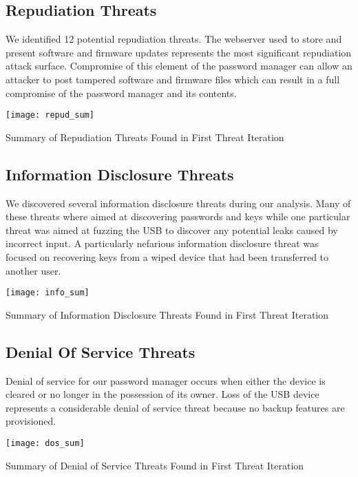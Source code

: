 \subsection{Repudiation Threats}


We identified 12 potential repudiation threats.  The webserver used to store and present software and firmware updates
represents the most significant repudiation attack surface.  Compromise of this
element of the password manager can allow an attacker to post tampered software
and firmware files which can result in a full compromise of the password manager
and its contents.
\begin{table*}[ht]
    \centering
    \texttt{[image: repud\_sum]}
    \caption{Summary of Repudiation Threats Found in First Threat Iteration}
    \label{tab:repudsum}
\end{table*}



\subsection{Information Disclosure Threats}
We discovered several information disclosure threats during our analysis.  Many
of these threats where aimed at discovering passwords and keys while one
particular threat was aimed at fuzzing the USB to discover any potential leaks
caused by incorrect input.  A particularly nefarious information disclosure threat
was focused on recovering keys from a wiped device that had been transferred to
another user. 

\begin{table*}[ht]
    \centering
    \texttt{[image: info\_sum]}
    \caption{Summary of Information Disclosure Threats Found in First Threat Iteration}
    \label{tab:infosum}
\end{table*}


\subsection{Denial Of Service Threats}
Denial of service for our password manager occurs when either the device is
cleared or no longer in the possession of its owner.  Loss of the USB device
represents a considerable denial of service threat because no backup features
are provisioned.
\begin{table*}[ht]
    \centering
    \texttt{[image: dos\_sum]}
    \caption{Summary of Denial of Service Threats Found in First Threat Iteration}
    \label{tab:dossum}
\end{table*}


